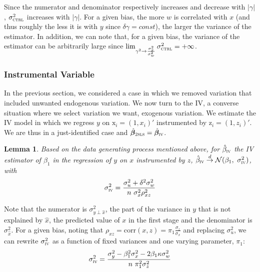 \documentclass[usletter, 12pt]{article}
\newtheorem{lemma}{Lemma}
\begin{document}
				Since the numerator and denominator respectively increases and decrease with $|\gamma|$,  $\sigma_{\textsc{ctrl}}^{2}$ increases with $|\gamma|$. For a given bias, the more $w$ is correlated with $x$ (and thus roughly the less it is with $y$ since $\delta \gamma = const$), the larger the variance of the estimator. In addition, we can note that, for a given bias, the variance of the estimator can be arbitrarily large since $\lim_{\gamma^{2} \to \frac{\sigma_{x}^{2}}{\sigma_{w}^{2}}} \sigma_{\textsc{ctrl}}^{2} = + \infty$.
				
			
		
		\subsubsection{Instrumental Variable}
		
			In the previous section, we considered a case in which we removed variation that included unwanted endogenous variation. We now turn to the IV, a converse situation where we select variation we want, exogenous variation. We estimate the IV model in which we regress $y$ on $\text{x}_{i} = (1, x_{i})'$ instrumented by $\text{z}_{i} = (1, z_{i})'$. We are thus in a just-identified case and $\hat{\bm{\beta}}_{\textsc{2sls}} = \hat{\bm{\beta}}_{\textsc{iv}}$.						
			\begin{lemma}\label{lemma_iv}
				Based on the data generating process mentioned above, for $\hat{\beta}_{\textsc{iv}}$ the IV estimator of $\beta_{1}$ in the regression of $y$ on $x$ instrumented by $z$,  $\hat{\beta}_{\textsc{iv}} \overset{d}{\to} \mathcal{N}(\beta_{1}, \ \sigma_{\textsc{iv}}^{2})$, with
					\[
						\sigma_{\textsc{iv}}^{2} = \dfrac{\sigma_{u}^{2} + \delta^{2}\sigma_{w}^{2}}{n \ \sigma_{x}^{2} \rho_{xz}^{2}}
					\]
			\end{lemma}
			
			Note that the numerator is $\sigma_{y \perp \hat{x}}^{2}$, the part of the variance in $y$ that is not explained by $\hat{x}$, the predicted value of $x$ in the first stage and the denominator is $\sigma_{\hat{x}}^{2}$. For a given bias, noting that $\rho_{xz} = \text{corr}(x, z) = \pi_1 \frac{\sigma_z}{\sigma_x}$ and replacing $\sigma_{u}^{2}$, we can rewrite $\sigma_{\textsc{iv}}^{2}$ as a function of fixed variances and one varying parameter, $\pi_{1}$:
			\[
				\sigma_{\textsc{iv}}^{2} = \dfrac{\sigma_{y}^{2} - \beta_{1}^{2}\sigma_{x}^{2} - 2\beta_{1}\kappa \sigma_{w}^{2}}{n \ \pi_{1}^{2} \sigma_{z}^{2}}
			\]
			
\end{document}
